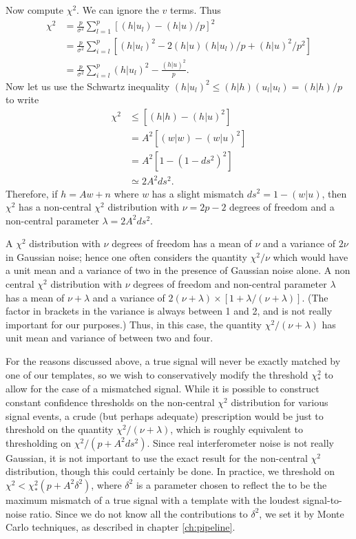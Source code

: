 Now compute $\chi^2$.  We can ignore the $v$ terms.  Thus
\begin{equation}
\begin{split}
\chi^2 &= \frac{p}{\sigma^2} \sum_{l=1}^p \left[ (h|u_l) - (h|u)/p \right]^2  \\
&= \frac{p}{\sigma^2} \sum_{i=l}^p \left[ (h|u_l)^2 - 2(h|u)(h|u_l)/p + (h|u)^2/p^2 \right] \\
&= \frac{p}{\sigma^2}\sum_{i=l}^p (h|u_l)^2 - \frac{(h|u)^2}{p}.
\end{split}
\end{equation}
Now let us use the Schwartz inequality $(h|u_l)^2\le(h|h)(u_l|u_l)=(h|h)/p$ to
write
\begin{equation}
\begin{split}
\chi^2 &\le \left[ (h|h) - (h|u)^2 \right]  \\
&= A^2\left[ (w|w) - (w|u)^2 \right] \\
&= A^2 \left[ 1 - ( 1 - ds^2 )^2 \right] \\
&\simeq 2A^2ds^2.
\end{split}
\end{equation}
Therefore, if $h=Aw+n$ where $w$ has a slight mismatch $ds^2=1-(w|u)$, then
$\chi^2$ has a non-central $\chi^2$ distribution with $\nu=2p-2$ degrees of
freedom and a non-central parameter $\lambda=2A^2ds^2$.

A $\chi^2$ distribution with $\nu$ degrees of freedom has a mean of $\nu$
and a variance of $2\nu$ in Gaussian noise; hence one often considers the
quantity $\chi^2/\nu$ which would have a unit mean and a variance of two in
the presence of Gaussian noise alone.  A non central $\chi^2$ distribution
with $\nu$ degrees of freedom and non-central parameter $\lambda$ has a mean
of $\nu+\lambda$ and a variance of
$2(\nu+\lambda)\times[1+\lambda/(\nu+\lambda)]$.  (The factor in brackets in
the variance is always between 1 and 2, and is not really important for our
purposes.)  Thus, in this case, the quantity $\chi^2/(\nu+\lambda)$ has unit
mean and variance of between two and four.

For the reasons discussed above, a true signal will never be exactly matched
by one of our templates, so we wish to conservatively modify the threshold
$\chi^2_\ast$ to allow for the case of a mismatched signal. While it is
possible to construct constant confidence thresholds on the non-central
$\chi^2$ distribution for various signal events, a crude (but perhaps
adequate) prescription would be just to threshold on the quantity
$\chi^2/(\nu+\lambda)$, which is roughly equivalent to thresholding on
$\chi^2/(p+A^2 ds^2)$.  Since real interferometer noise is not really
Gaussian, it is not important to use the exact result for the non-central
$\chi^2$ distribution, though this could certainly be done. In practice, we
threshold on $\chi^2 < \chi^2_\ast (p+A^2 \delta^2)$, where $\delta^2$ is a
parameter chosen to reflect the to be the maximum mismatch of a true signal
with a template with the loudest signal-to-noise ratio. Since we do not know
all the contributions to $\delta^2$, we set it by Monte Carlo techniques, as
described in chapter \ref{ch:pipeline}.

